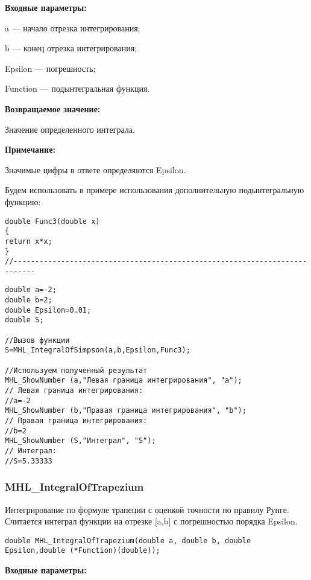 \documentclass[a4paper,12pt]{article}
\begin{document}
\textbf{Входные параметры:}

 a --- начало отрезка интегрирования;
 
 b --- конец отрезка интегрирования;
 
 Epsilon --- погрешность;
 
 Function --- подынтегральная функция.

\textbf{Возвращаемое значение:}
 
 Значение определенного интеграла.
 
 \textbf{Примечание:}
 
 Значимые цифры в ответе определяются Epsilon.

Будем использовать в примере использования дополнительную подынтегральную функцию:

\begin{lstlisting}[caption=Дополнительная функция]
double Func3(double x)
{
return x*x;
}
//---------------------------------------------------------------------------
\end{lstlisting}


\begin{lstlisting}[label=code_use_MHL_IntegralOfSimpson,caption=Пример использования]
double a=-2;
double b=2;
double Epsilon=0.01;
double S;

//Вызов функции
S=MHL_IntegralOfSimpson(a,b,Epsilon,Func3);

//Используем полученный результат
MHL_ShowNumber (a,"Левая граница интегрирования", "a");
// Левая граница интегрирования:
//a=-2
MHL_ShowNumber (b,"Правая граница интегрирования", "b");
// Правая граница интегрирования:
//b=2
MHL_ShowNumber (S,"Интеграл", "S");
// Интеграл:
//S=5.33333
\end{lstlisting}

\subsubsection{MHL\_IntegralOfTrapezium}\label{MHL_IntegralOfTrapezium}

Интегрирование по формуле трапеции с оценкой точности по правилу Рунге. Считается интеграл функции на отрезке [a,b] с погрешностью порядка Epsilon.


\begin{lstlisting}[label=code_syntax_MHL_IntegralOfTrapezium,caption=Синтаксис]
double MHL_IntegralOfTrapezium(double a, double b, double Epsilon,double (*Function)(double));
\end{lstlisting}

\textbf{Входные параметры:}
\end{document}
